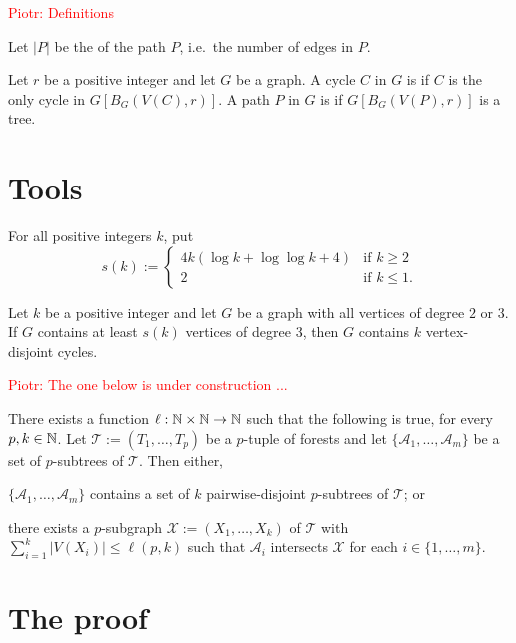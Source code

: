 \documentclass{patmorin}
\newcommand{\piotr}[1]{\textcolor{red}{Piotr: #1}}
\begin{document}

\piotr{Definitions}

Let $|P|$ be the  of the path $P$, i.e.\ the number of edges in $P$.

Let $r$ be a positive integer and let $G$ be a graph. 
A cycle $C$ in $G$ is  
if $C$ is the only cycle in $G[B_G(V(C),r)]$.  A path $P$ in $G$ is  if $G[B_G(V(P),r)]$ is a tree.

\section{Tools}
For all positive integers $k$, put
\[
s(k):=\begin{cases}
4k(\log k + \log\log k +4)&\textrm{if $k\geq2$}\\
2&\textrm{if $k\leq1$.}
\end{cases}
\]
\begin{thm}
\label{thm:simonovits}
Let $k$ be a positive integer and 
let $G$ be a graph with all vertices of degree $2$ or $3$. 
If $G$ contains at least $s(k)$ vertices of degree $3$, then 
$G$ contains $k$ vertex-disjoint cycles.
\end{thm}

\piotr{The one below is under construction ...}
\begin{thm}\label{thm:gyarfas-lehel}
   There exists a function $\ell:\mathbb{N}\times\mathbb{N}\to\mathbb{N}$ such that the following is true, for every $p,k\in\mathbb{N}$.
   Let $\mathcal{T}:=(T_1,\ldots,T_p)$ be a $p$-tuple of forests and let $\{\mathcal{A}_1,\ldots,\mathcal{A}_m\}$ be a set of $p$-subtrees of $\mathcal{T}$. Then either,
   \begin{compactenum}[(a)]
     \item $\{\mathcal{A}_1,\ldots,\mathcal{A}_m\}$ contains a set of $k$ pairwise-disjoint $p$-subtrees of $\mathcal{T}$; or
     \item there exists a $p$-subgraph $\mathcal{X}:=(X_1,\ldots,X_k)$ of $\mathcal{T}$ with $\sum_{i=1}^k|V(X_i)|\le \ell(p,k)$ such that $\mathcal{A}_i$ intersects $\mathcal{X}$ for each $i\in\{1,\ldots,m\}$.
   \end{compactenum}
\end{thm}


\section{The proof}
\end{document}
